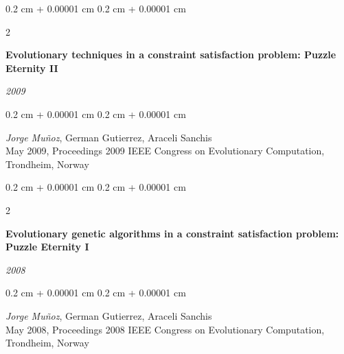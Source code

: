 \documentclass[10pt, letterpaper]{article}
\newenvironment{onecolentry}{
	\begin{adjustwidth}{
		0.2 cm + 0.00001 cm
	}{
		0.2 cm + 0.00001 cm
	}
	}{
	\end{adjustwidth}
} %
\newenvironment{twocolentry}[2][]{
	\onecolentry
	\def\secondColumn{#2}
	\setcolumnwidth{\fill, 5.5 cm}
	\begin{paracol}{2}
	}{
		\switchcolumn \raggedleft \secondColumn
	\end{paracol}
	\endonecolentry
} %
\let\hrefWithoutArrow\href
\renewcommand{\href}[2]{\hrefWithoutArrow{#1}{\ifthenelse{\equal{#2}{}}{ }{#2 }\raisebox{.15ex}{\footnotesize \faExternalLink*}}}
\begin{document}
	\vspace{0.10 cm}

	\begin{twocolentry}{
		\textit{2009}}
		\textbf{Evolutionary techniques in a constraint satisfaction problem: Puzzle Eternity II}
	\end{twocolentry}

	\vspace{0.10 cm}
	\begin{onecolentry}
		\textit{Jorge Muñoz}, German Gutierrez, Araceli Sanchis\\
		May 2009, Proceedings 2009 IEEE Congress on Evolutionary Computation, Trondheim, Norway\\
		\href{http://users.encs.concordia.ca/~kharma/coen6321/Papers/EternityGA\%20(1).pdf}{[PDF]}
	\end{onecolentry}

	\vspace{0.2 cm}

	\begin{twocolentry}{
		\textit{2008}}
		\textbf{Evolutionary genetic algorithms in a constraint satisfaction problem: Puzzle Eternity I}
	\end{twocolentry}

	\vspace{0.10 cm}
	\begin{onecolentry}
		\textit{Jorge Muñoz}, German Gutierrez, Araceli Sanchis\\
		May 2008, Proceedings 2008 IEEE Congress on Evolutionary Computation, Trondheim, Norway\\
		\href{http://users.encs.concordia.ca/~kharma/coen6321/Papers/EternityGA\%20(1).pdf}{[PDF]}
	\end{onecolentry}
\end{document}
